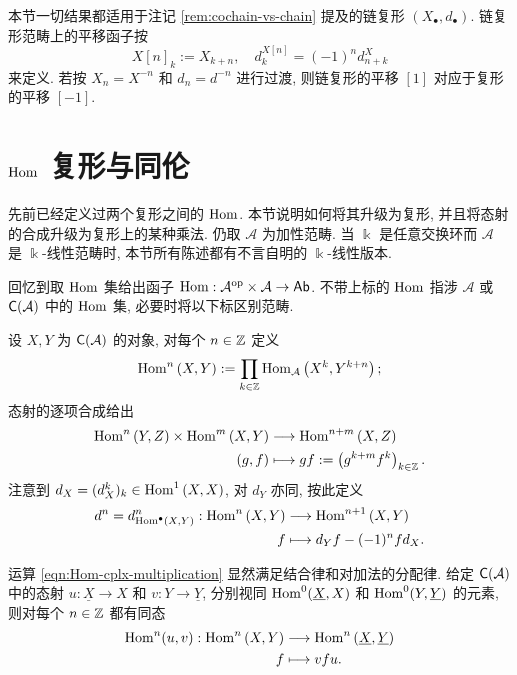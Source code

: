 \begin{remark}\label{rem:chain-cplx-translation}
	\index[sym1]{[n]}
	本节一切结果都适用于注记 \ref{rem:cochain-vs-chain} 提及的链复形 $(X_\bullet, d_\bullet)$. 链复形范畴上的平移函子按
	\[ X[n]_k := X_{k+n}, \quad d^{X[n]}_k = (-1)^n d^X_{n+k} \]
	来定义. 若按 $X_n = X^{-n}$ 和 $d_n = d^{-n}$ 进行过渡, 则链复形的平移 $[1]$ 对应于复形的平移 $[-1]$.
\end{remark}

\section{\texorpdfstring{$\Hom$}{Hom} 复形与同伦}\label{sec:Hom-cplx}
先前已经定义过两个复形之间的 $\Hom$. 本节说明如何将其升级为复形, 并且将态射的合成升级为复形上的某种乘法. 仍取 $\mathcal{A}$ 为加性范畴. 当 $\Bbbk$ 是任意交换环而 $\mathcal{A}$ 是 $\Bbbk$-线性范畴时, 本节所有陈述都有不言自明的 $\Bbbk$-线性版本.

回忆到取 $\Hom$ 集给出函子 $\operatorname{Hom}: \mathcal{A}^{\operatorname{op}} \times \mathcal{A} \to \mathsf{Ab}$. 不带上标的 $\Hom$ 指涉 $\mathcal{A}$ 或 $\mathsf{C}(\mathcal{A})$ 中的 $\Hom$ 集, 必要时将以下标区别范畴.

\begin{definition}[$\Hom$ 复形]\label{def:Hom-cplx}
	设 $X, Y$ 为 $\mathsf{C}(\mathcal{A})$ 的对象, 对每个 $n \in \mathbb{Z}$ 定义
	\[ \operatorname{Hom}^n\left(X, Y \right) := \prod_{k \in \mathbb{Z}} \operatorname{Hom}_{\mathcal{A}}\left( X^k, Y^{k+n} \right); \]
	态射的逐项合成给出
	\begin{equation}\label{eqn:Hom-cplx-multiplication}\begin{aligned}
		\operatorname{Hom}^n \left(Y, Z \right) \times \operatorname{Hom}^m\left( X, Y \right) & \longrightarrow \operatorname{Hom}^{n+m}\left(X , Z \right) \\
		(g, f) & \longmapsto gf := \left( g^{k+m} f^k \right)_{k \in \mathbb{Z}}.
	\end{aligned}\end{equation}
	注意到 $d_X = (d_X^k)_k \in \operatorname{Hom}^1\left(X, X\right)$, 对 $d_Y$ 亦同, 按此定义
	\begin{align*}
		d^n = d_{\operatorname{Hom}^\bullet(X, Y)}^n: \operatorname{Hom}^n\left(X, Y \right) & \longrightarrow \operatorname{Hom}^{n+1}\left(X, Y \right) \\
		f & \longmapsto d_Y f - (-1)^n f d_X.
	\end{align*}
\end{definition}

运算 \eqref{eqn:Hom-cplx-multiplication} 显然满足结合律和对加法的分配律. 给定 $\mathsf{C}(\mathcal{A})$ 中的态射 $u: \underline{X} \to X$ 和 $v: Y \to \underline{Y}$, 分别视同 $\operatorname{Hom}^0(\underline{X}, X)$ 和 $\operatorname{Hom}^0(Y, \underline{Y})$ 的元素, 则对每个 $n \in \mathbb{Z}$ 都有同态
\begin{equation}\label{eqn:Hom-cplx-functoriality}\begin{aligned}
		\operatorname{Hom}^n(u, v): \operatorname{Hom}^n\left( X, Y\right) & \longrightarrow \operatorname{Hom}^n\left(\underline{X}, \underline{Y}\right) \\
		f & \longmapsto vfu.
\end{aligned}\end{equation}

